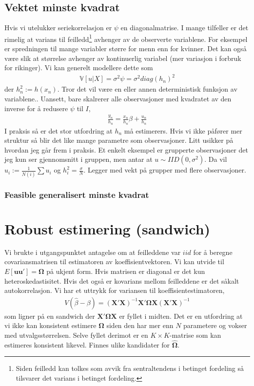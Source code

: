 \subsection{Vektet minste kvadrat}
Hvis vi utelukker seriekorrelasjon er $\psi$ en diagonalmatrise. I mange tilfeller er det rimelig at varians til feilledd\footnote{Siden feilledd kan tolkes som avvik fra sentraltendens i betinget fordeling så tilsvarer det varians i betinget fordeling.} avhenger av de observerte variablene. For eksempel er spredningen til mange variabler større for menn enn for kvinner. Det kan også være slik at størrelse avhenger av kontinuerlig variabel (mer variasjon i forbruk for rikinger). Vi kan generelt modellere dette som
\begin{align}
\mathbb{V}[u|X] = \sigma^2\psi=\sigma^2 diag(h_n)^2
\end{align}
der $h_n^2 := h(x_n)$. Tror det vil være en eller annen deterministisk funksjon av variablene.. Uansett, bare skalrerer alle observasjoner med kvadratet av den inverse for å redusere $\psi$ til $I$,
\begin{align}
\frac{y_n}{h_n} = \frac{x_n}{h_n}\beta+\frac{u_n}{h_n}
\end{align}
I praksis så er det stor utfordring at $h_n$ må estimerers. Hvis vi ikke påfører mer struktur så blir det like mange parametre som observasjoner. Litt usikker på hvordan jeg går frem i praksis. Et enkelt eksempel er grupperte observasjoner det jeg kun ser gjennomsnitt i gruppen, men antar at $u\sim IID(0,\sigma^2)$. Da vil $u_i := \frac{1}{N(i)}\sum u_i$ og $h_i^2 = \frac{\sigma}{N}$. Legger med vekt på grupper med flere observasjoner.
\subsubsection{Feasible generalisert minste kvadrat}
\section{Robust estimering (sandwich)}
Vi brukte i utgangspunktet antagelse om at feilleddene var $iid$ for å beregne covariansmatrisen til estimatoren av koeffisientvektoren. Vi kan utvide til $E[\mathbf{u}\mathbf{u}']=\mathbf{\Omega}$ på ukjent form. Hvis matrisen er diagonal er det kun heteroskedastisitet. Hvis det også er kovarians mellom feilleddene er det såkalt autokorrelasjon. Vi har et uttrykk for variansen til koeffisientestimatoren,
\begin{align}
V(\hat{\beta}-\beta)=(\mathbf{X}'\mathbf{X})^{-1}\mathbf{X}'\mathbf{\Omega}\mathbf{X}(\mathbf{X}'\mathbf{X})^{-1}
\end{align}
som ligner på en sandwich der $\mathbf{X}'\mathbf{\Omega}\mathbf{X}$ er fyllet i midten. Det er en utfordring at vi ikke kan konsistent estimere $\mathbf{\Omega}$ siden den har mer enn $N$ parametere og vokser med utvalgsstørrelsen. Selve fyllet derimot er en $K\times K$-matrise som kan estimeres konsistent likevel. Finnes ulike kandidater for $\hat{\mathbf{\Omega}}$.
